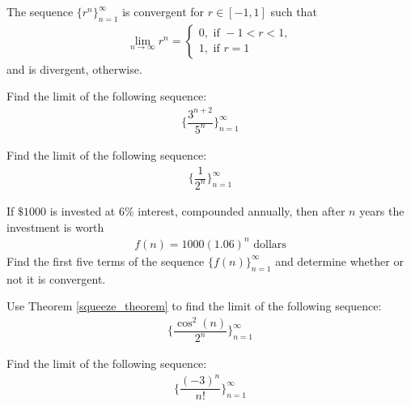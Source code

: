 \begin{theorem}
The sequence $\{r^{n}\}_{n=1}^{\infty}$ is convergent for $r \in [-1, 1]$ such that
\begin{align*}
    \lim_{n \longrightarrow \infty} r^{n} = \begin{cases}
    0, \hspace{4pt} \text{if} \hspace{4pt} -1 < r < 1,\\[2ex]
    1, \hspace{4pt} \text{if} \hspace{4pt} r = 1
    \end{cases}
\end{align*}
and is divergent, otherwise.
\label{geometric_term_sequence}
\end{theorem}

\begin{exercise}
Find the limit of the following sequence:
\begin{align*}
    \Big\{\dfrac{3^{n+2}}{5^{n}}\Big\}_{n=1}^{\infty}
\end{align*}
\end{exercise}

\begin{exercise}
Find the limit of the following sequence:
\begin{align*}
    \Big\{\dfrac{1}{2^{n}}\Big\}_{n=1}^{\infty}
\end{align*}
\end{exercise}

\begin{exercise}
If $\$1000$ is invested at $6\%$ interest, compounded annually, then after $n$ years the investment is worth
\begin{align*}
    f(n) = 1000(1.06)^{n} \hspace{4pt} \text{dollars}
\end{align*}
Find the first five terms of the sequence $\{f(n)\}_{n=1}^{\infty}$ and determine whether or not it is convergent.
\end{exercise}

\begin{exercise}
Use Theorem \ref{squeeze_theorem} to find the limit of the following sequence:
\begin{align*}
    \Big\{\dfrac{\cos^{2}(n)}{2^{n}}\Big\}_{n=1}^{\infty}
\end{align*}
\end{exercise}

\begin{exercise}
Find the limit of the following sequence:
\begin{align*}
    \Big\{\dfrac{(-3)^{n}}{n!}\Big\}_{n=1}^{\infty}
\end{align*}
\end{exercise}

